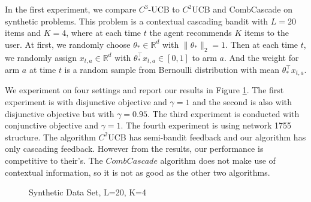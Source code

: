\documentclass{article}
\newcommand{\RR}{\mathbb{R}}
\begin{document}
In the first experiment, we compare $C^3$-UCB to $C^2$UCB and CombCascade on synthetic problems. This problem is a contextual cascading bandit with $L=20$ items and $K=4$, where at each time $t$ the agent recommends $K$ items to the user. At first, we randomly choose $\theta_* \in \RR^d$ with $\|\theta_{\ast}\|_2 = 1$. Then at each time $t$, we randomly assign $x_{t,a} \in \RR^d$ with $\theta_*^{\top}x_{t,a} \in [0,1]$ to arm $a$. And the weight for arm $a$ at time $t$ is a random sample from Bernoulli distribution with mean $\theta_*^{\top}x_{t,a}$.

We experiment on four settings and report our results in Figure \ref{fig:synthetic}. The first experiment is with disjunctive objective and $\gamma=1$ and the second is also with disjunctive objective but with $\gamma=0.95$. The third experiment is conducted with conjunctive objective and $\gamma=1$. The fourth experiment is using network 1755 structure. The algorithm $C^2$UCB has semi-bandit feedback and our algorithm has only cascading feedback. However from the results, our performance is competitive to their's. The $CombCascade$ algorithm does not make use of contextual information, so it is not as good as the other two algorithms. 

\begin{figure}
	\centering
	\caption{Synthetic Data Set, L=20, K=4}
	\label{fig:synthetic} %
\end{figure}
\end{document}
